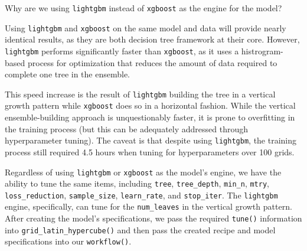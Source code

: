 \documentclass[
  letterpaper,
]{krantz}
\begin{document}
\begin{tcolorbox}[enhanced jigsaw, left=2mm, toprule=.15mm, opacitybacktitle=0.6, leftrule=.75mm, bottomrule=.15mm, colbacktitle=quarto-callout-note-color!10!white, breakable, colback=white, bottomtitle=1mm, toptitle=1mm, title=\textcolor{quarto-callout-note-color}{\faInfo}\hspace{0.5em}{Note}, coltitle=black, titlerule=0mm, arc=.35mm, opacityback=0, colframe=quarto-callout-note-color-frame, rightrule=.15mm]

Why are we using \texttt{lightgbm} instead of \texttt{xgboost} as the
engine for the model?

Using \texttt{lightgbm} and \texttt{xgboost} on the same model and data
will provide nearly identical results, as they are both decision tree
framework at their core. However, \texttt{lightgbm} performs
significantly faster than \texttt{xgboost}, as it uses a
histrogram-based process for optimization that reduces the amount of
data required to complete one tree in the ensemble.

This speed increase is the result of \texttt{lightgbm} building the tree
in a vertical growth pattern while \texttt{xgboost} does so in a
horizontal fashion. While the vertical ensemble-building approach is
unquestionably faster, it is prone to overfitting in the training
process (but this can be adequately addressed through hyperparameter
tuning). The caveat is that despite using \texttt{lightgbm}, the
training process still required 4.5 hours when tuning for
hyperparameters over 100 grids.

\end{tcolorbox}

Regardless of using \texttt{lightgbm} or \texttt{xgboost} as the model's
engine, we have the ability to tune the same items, including
\texttt{tree}, \texttt{tree\_depth}, \texttt{min\_n}, \texttt{mtry},
\texttt{loss\_reduction}, \texttt{sample\_size}, \texttt{learn\_rate},
and \texttt{stop\_iter}. The \texttt{lightgbm} engine, specifically, can
tune for the \texttt{num\_leaves} in the vertical growth pattern. After
creating the model's specifications, we pass the required
\texttt{tune()} information into \texttt{grid\_latin\_hypercube()} and
then pass the created recipe and model specifications into our
\texttt{workflow()}.
\end{document}

